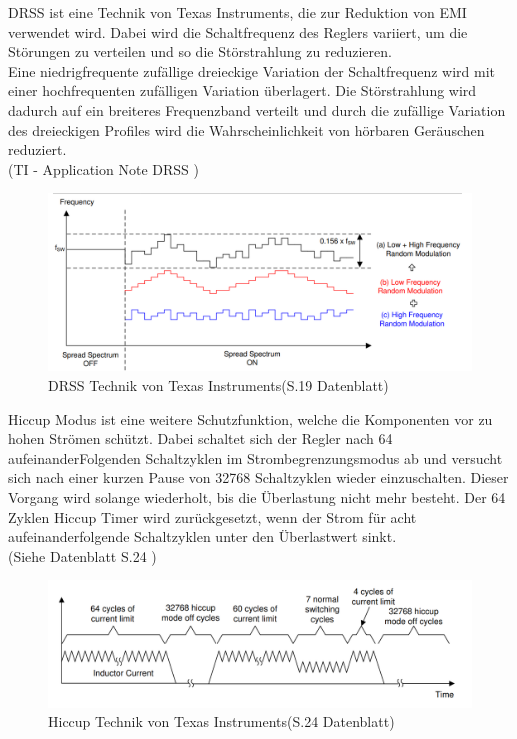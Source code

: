 \ac{DRSS} ist eine Technik von Texas Instruments, die zur Reduktion von \ac{EMI} verwendet wird. Dabei wird die Schaltfrequenz
des Reglers variiert, um die Störungen zu verteilen und so die Störstrahlung zu reduzieren. \\
Eine niedrigfrequente zufällige dreieckige Variation der Schaltfrequenz wird mit einer hochfrequenten zufälligen Variation überlagert.
Die Störstrahlung wird dadurch auf ein breiteres Frequenzband verteilt und durch die zufällige Variation des dreieckigen Profiles
wird die Wahrscheinlichkeit von hörbaren Geräuschen reduziert. \\
(TI - Application Note DRSS \cite{drss})

\begin{figure}[H]
    \centering
    \includegraphics[width=1\textwidth]{resources/images/drss.png}
    \caption[DRSS]{DRSS Technik von Texas Instruments(S.19 Datenblatt\cite{LM5157})}
    \label{fig:drss}
\end{figure}

Hiccup Modus ist eine weitere Schutzfunktion, welche die Komponenten vor zu hohen Strömen schützt. Dabei schaltet sich der Regler
nach 64 aufeinanderFolgenden Schaltzyklen im Strombegrenzungsmodus ab und versucht sich nach einer kurzen Pause von
32768 Schaltzyklen wieder einzuschalten. Dieser Vorgang wird solange wiederholt, bis die Überlastung nicht mehr besteht.
Der 64 Zyklen Hiccup Timer wird zurückgesetzt, wenn der Strom für acht aufeinanderfolgende Schaltzyklen unter den Überlastwert sinkt. \\
(Siehe Datenblatt S.24 \cite{LM5157})

\begin{figure}[H]
    \centering
    \includegraphics[width=1\textwidth]{resources/images/hiccup.png}
    \caption[Hickup]{Hiccup Technik von Texas Instruments(S.24 Datenblatt\cite{LM5157})}
    \label{fig:hiccup}
\end{figure}

